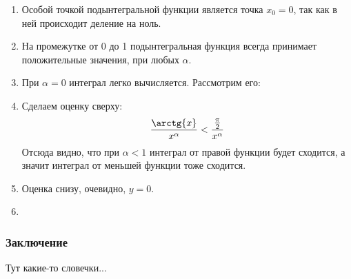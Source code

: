 \documentclass{article}
\begin{document}
\begin{enumerate}
    \item Особой точкой подынтегральной функции является точка $x_0 = 0$, так как в ней происходит деление на ноль.
    \item На промежутке от 0 до 1 подынтегральная функция всегда принимает положительные значения, при любых $\alpha$.
    \item При $\alpha = 0$ интеграл легко вычисляется. Рассмотрим его:
    

    \item Сделаем оценку сверху:
    $$
    \frac{\arctg{x}}{x^{\alpha}} < \frac{\frac{\pi}{2}}{x^{\alpha}}
    $$
    Отсюда видно, что при $\alpha<1$ интеграл от правой функции будет сходится, а значит интеграл от меньшей функции тоже сходится.

    \item Оценка снизу, очевидно, $y = 0$.

    \item
\end{enumerate}

\subsubsection*{Заключение}

Тут какие-то словечки...
\end{document}
